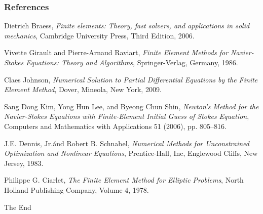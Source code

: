 \documentclass{beamer}
\begin{document}
\begin{frame}[shrink=30]
    \frametitle{References}
    \footnotesize{
        \begin{thebibliography}{99}

                Dietrich Braess,
                \newblock%
                \emph{Finite elements: Theory, fast solvers, and
                applications in solid mechanics},
                \newblock%
                Cambridge University Press,
                Third Edition,
                2006.

                Vivette Girault and Pierre-Arnaud Raviart,
                \newblock%
                \emph{Finite Element Methods for Navier-Stokes Equations:
                Theory and Algorithms},
                \newblock%
                Springer-Verlag, Germany, 1986.

                Claes Johnson,
                \newblock%
                \emph{Numerical Solution to Partial Differential Equations
                by the Finite Element Method},
                \newblock%
                Dover, Mineola, New York, 2009.

                Sang Dong Kim, Yong Hun Lee, and Byeong Chun Shin,
                \newblock%
                \emph{Newton's Method for the Navier-Stokes Equations with
                Finite-Element Initial Guess of Stokes Equation},
                \newblock%
                Computers and Mathematics with Applications 51 (2006), pp.
                805--816.

                J.E. Dennis, Jr.\'and Robert B. Schnabel,
                \newblock%
                \emph{Numerical Methods for Unconstrained Optimization and
                Nonlinear Equations},
                \newblock%
                Prentice-Hall, Inc, Englewood Cliffs, New Jersey, 1983.

                Philippe G. Ciarlet,
                \newblock%
                \emph{The Finite Element Method for Elliptic Problems},
                \newblock%
                North Holland Publishing Company, Volume 4, 1978.
        \end{thebibliography}
    }
\end{frame}


\begin{frame}
    \Huge{\centerline{The End}}
\end{frame}

\end{document}
